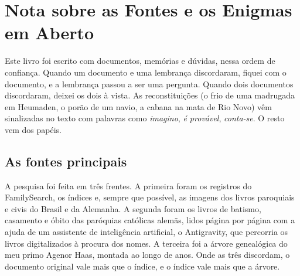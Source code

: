 \documentclass[
  brazilian,
  11pt,
  openany]{book}
\begin{document}
\chapter*{Nota sobre as Fontes e os Enigmas em
Aberto}\label{nota-fontes}

Este livro foi escrito com documentos, memórias e dúvidas, nessa ordem
de confiança. Quando um documento e uma lembrança discordaram, fiquei
com o documento, e a lembrança passou a ser uma pergunta. Quando dois
documentos discordaram, deixei os dois à vista. As reconstituições (o
frio de uma madrugada em Heumaden, o porão de um navio, a cabana na mata
de Rio Novo) vêm sinalizadas no texto com palavras como \emph{imagino},
\emph{é provável}, \emph{conta-se}. O resto vem dos papéis.

\section{As fontes principais}\label{as-fontes-principais}

A pesquisa foi feita em três frentes. A primeira foram os registros do
FamilySearch, os índices e, sempre que possível, as imagens dos livros
paroquiais e civis do Brasil e da Alemanha. A segunda foram os livros de
batismo, casamento e óbito das paróquias católicas alemãs, lidos página
por página com a ajuda de um assistente de inteligência artificial, o
Antigravity, que percorria os livros digitalizados à procura dos nomes.
A terceira foi a árvore genealógica do meu primo Agenor Haas, montada ao
longo de anos. Onde as três discordam, o documento original vale mais
que o índice, e o índice vale mais que a árvore.
\end{document}
